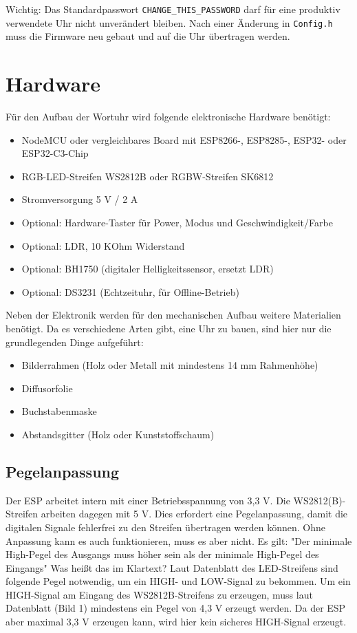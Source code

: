 \documentclass[12pt,a4paper, german,oneside, headinclude, headsepline,plainheadsepline,BCOR20mm, DIV18,parskip=half, openright, numbers=noenddot, captions=tableheading,version=first,listof=totoc,version=first]{scrbook}
\begin{document}
Wichtig: Das Standardpasswort \texttt{CHANGE\_THIS\_PASSWORD} darf für eine produktiv verwendete Uhr nicht unverändert bleiben. Nach einer Änderung in \texttt{Config.h} muss die Firmware neu gebaut und auf die Uhr übertragen werden.

\chapter{Hardware}

Für den Aufbau der Wortuhr wird folgende elektronische Hardware benötigt:

\begin{itemize}
    \item NodeMCU oder vergleichbares Board mit ESP8266-, ESP8285-, ESP32- oder ESP32-C3-Chip
    \item RGB-LED-Streifen WS2812B oder RGBW-Streifen SK6812
    \item Stromversorgung 5 V / 2 A
    \item Optional: Hardware-Taster für Power, Modus und Geschwindigkeit/Farbe
    \item Optional: LDR, 10 KOhm Widerstand
    \item Optional: BH1750 (digitaler Helligkeitssensor, ersetzt LDR)
    \item Optional: DS3231 (Echtzeituhr, für Offline-Betrieb)
\end{itemize}

Neben der Elektronik werden für den mechanischen Aufbau weitere Materialien benötigt. Da es verschiedene Arten gibt, eine Uhr zu bauen, sind hier nur die grundlegenden Dinge aufgeführt:

\begin{itemize}
    \item Bilderrahmen (Holz oder Metall mit mindestens 14 mm Rahmenhöhe)
    \item Diffusorfolie
    \item Buchstabenmaske
    \item Abstandsgitter (Holz oder Kunststoffschaum)
\end{itemize}

\section{Pegelanpassung}

Der ESP arbeitet intern mit einer Betriebsspannung von 3,3 V. Die WS2812(B)-Streifen arbeiten dagegen mit 5 V. Dies erfordert eine Pegelanpassung, damit die digitalen Signale fehlerfrei zu den Streifen übertragen werden können. Ohne Anpassung kann es auch funktionieren, muss es aber nicht.
Es gilt: "Der minimale High-Pegel des Ausgangs muss höher sein als der minimale High-Pegel des Eingangs"
Was heißt das im Klartext?
Laut Datenblatt des LED-Streifens sind folgende Pegel notwendig, um ein  HIGH- und LOW-Signal zu bekommen.
Um ein HIGH-Signal am Eingang des WS2812B-Streifens zu erzeugen, muss laut Datenblatt (Bild 1) mindestens ein Pegel von 4,3 V erzeugt werden. Da der ESP aber maximal 3,3 V erzeugen kann, wird hier kein sicheres HIGH-Signal erzeugt.
\end{document}
